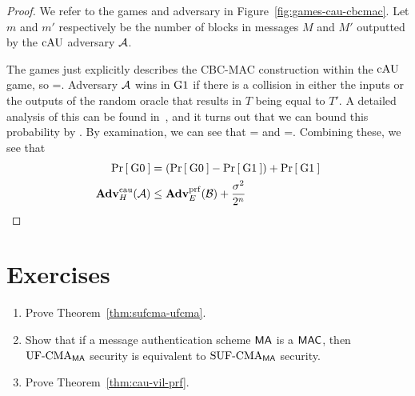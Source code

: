 \begin{proof}
	We refer to the games and adversary in Figure~\ref{fig:games-cau-cbcmac}. Let $m$ and $m'$ respectively be the number of blocks in messages $M$ and $M'$ outputted by the $\textnormal{cAU}$ adversary ${\mathcal A}$. 
	
	The games just explicitly describes the CBC-MAC construction within the $\textnormal{cAU}$ game, so 
	\bnm
	=\;.
	\enm
	Adversary ${\mathcal A}$ wins in ${{\textnormal G}}1$ if there is a collision in either the inputs or the outputs of the random oracle that results in $T$ being equal to $T'$. A detailed analysis of this can be found in~\cite{black2000cbc}, and it turns out that we can bound this probability by 
	\bnm
	\leq {}\;.
	\enm
	By examination, we can see that 
	\bnm
	=
	\enm
	and
	\bnm
	=\;.
	\enm
	Combining these, we see that 
	\begin{align*}
	\Pr\left[\: {{\textnormal G}}0 \:\right]&=(\Pr\left[\: {{\textnormal G}}0 \:\right]-\Pr\left[\: {{\textnormal G}}1 \:\right]) + \Pr\left[\: {{\textnormal G}}1 \:\right]\\
	\mathbf{Adv}^{\mathrm{cau}}_{H}({\mathcal A})&\leq \mathbf{Adv}^{\mathrm{prf}}_{E}({\mathcal B}) + \frac{\sigma^2}{2^n}
	\end{align*}
\end{proof}

\section*{Exercises}
\begin{enumerate}[label=\textbf{Exercise \thesection.\arabic*}, wide=0pt]
	\item Prove Theorem~\ref{thm:sufcma-ufcma}. \label{exercise:sufcma-ufcma}
	\item Show that if a message authentication scheme $\mathsf{MA}$ is a $\mathsf{MAC}$, then $\textnormal{UF-CMA}_{\mathsf{MA}}$ security is equivalent to $\textnormal{SUF-CMA}_{\mathsf{MA}}$ security. \label{exercise:mac-sufcma-ufcma}
	\item Prove Theorem~\ref{thm:cau-vil-prf}.
\end{enumerate}
